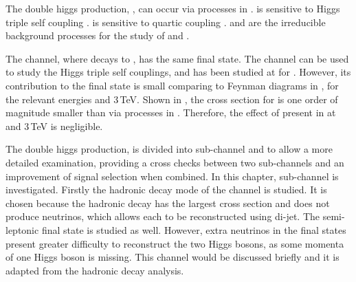 The double higgs production, \eeToHH, can occur via processes in .  is sensitive to Higgs triple self coupling \gHHH.  is sensitive to quartic coupling \gWWHH.  and   are the irreducible background processes for the study of \gHHH and \gWWHH.

The {\HepProcess{ \Pem \Pep \to \PZ \PHiggs \PHiggs}\xspace} channel, where \PZ decays to \Pnu \APnu, has the same \HepProcess{\PHiggs \PHiggs \Pnu \APnu} final state. The \HepProcess{\PZ \PHiggs \PHiggs} channel can be used to study the Higgs triple self couplings, and has been studied at \ILC for  \cite{Baer:2013cma}. However, its contribution to the \HepProcess{\PHiggs \PHiggs \Pnu \APnu} final state is small comparing to Feynman diagrams in , for the relevant  \CLIC energies  and 3\,TeV. Shown in , the cross section for {\HepProcess{ \Pem \Pep \to \PZ \PHiggs \PHiggs}\xspace} is one order of magnitude smaller than \eeToHH via processes in . Therefore, the effect of {\HepProcess{ \Pem \Pep \to \PZ \PHiggs \PHiggs}\xspace} present in \eeToHH at  and 3\,TeV is negligible.






The double higgs production, \eeToHH is divided into sub-channel \eeToHHbbWW and \eeToHHbbbb to allow a more detailed examination, providing a cross checks between two sub-channels and an improvement of signal selection when combined. In this chapter,   sub-channel \eeToHHbbWW is investigated. Firstly  the hadronic decay mode of the \eeToHHbbWW channel is studied. It is chosen because the hadronic decay has the largest cross section and does not produce neutrinos, which allows each \PW to be reconstructed using di-jet. The semi-leptonic final state is studied as well. However, extra neutrinos in the final states present greater difficulty to reconstruct the two Higgs bosons, as some momenta of one Higgs boson is missing. This channel would be discussed briefly and it is adapted from the hadronic decay analysis.

